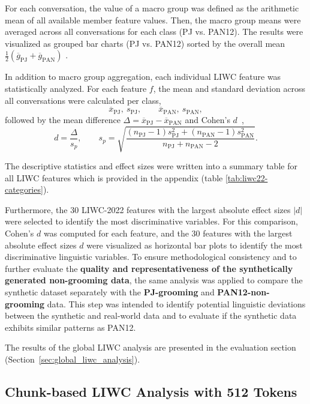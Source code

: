 For each conversation, the value of a macro group was defined as the arithmetic mean of all available member feature values. Then, the macro group means were averaged across all conversations for each class (PJ vs. PAN12). 
The results were visualized as grouped bar charts (PJ vs. PAN12) sorted by the overall mean \(\tfrac{1}{2}(\overline{g}_{\mathrm{PJ}}+\overline{g}_{\mathrm{PAN}})\) .

In addition to macro group aggregation, each individual LIWC feature was statistically analyzed. For each feature \(f\), the mean and standard deviation across all conversations were calculated per class,
\[
\overline{x}_{\mathrm{PJ}},\ s_{\mathrm{PJ}},
\qquad
\overline{x}_{\mathrm{PAN}},\ s_{\mathrm{PAN}},
\]
followed by the mean difference \(\Delta = \overline{x}_{\mathrm{PJ}} - \overline{x}_{\mathrm{PAN}}\) and Cohen's \(d\)~\cite{cohen1988},
\[
d = \frac{\Delta}{s_p},
\qquad
s_p = \sqrt{\frac{(n_{\mathrm{PJ}}-1)s_{\mathrm{PJ}}^2+(n_{\mathrm{PAN}}-1)s_{\mathrm{PAN}}^2}{n_{\mathrm{PJ}}+n_{\mathrm{PAN}}-2}}.
\]

The descriptive statistics and effect sizes were written into a summary table for all LIWC features which is provided in the appendix (table \ref{tab:liwc22-categories}).

Furthermore, the 30 LIWC-2022 features with the largest absolute effect sizes \(|d|\) were selected to identify the most discriminative variables. For this comparison, Cohen’s \(d\) was computed for each feature, and the 30 features with the largest absolute effect sizes \(d\) were visualized as horizontal bar plots to identify the most discriminative linguistic variables. To ensure methodological consistency and to further evaluate the \textbf{quality and representativeness of the synthetically generated non-grooming data}, the same analysis was applied to compare the synthetic dataset separately with the \textbf{PJ-grooming} and \textbf{PAN12-non-grooming} data. This step was intended to identify potential linguistic deviations between the synthetic and real-world data and to evaluate if the synthetic data exhibits similar patterns as PAN12.


The results of the global LIWC analysis are presented in the evaluation section (Section~\ref{sec:global_liwc_analysis}).

\subsection{Chunk-based LIWC Analysis with 512 Tokens}

